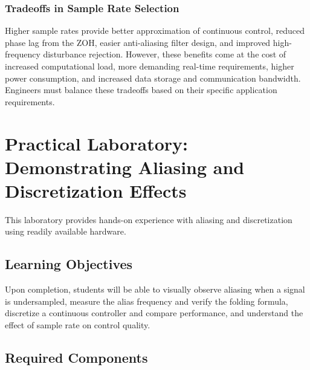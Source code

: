 \subsubsection{Tradeoffs in Sample Rate Selection}

Higher sample rates provide better approximation of continuous control, reduced phase lag from the ZOH, easier anti-aliasing filter design, and improved high-frequency disturbance rejection. However, these benefits come at the cost of increased computational load, more demanding real-time requirements, higher power consumption, and increased data storage and communication bandwidth. Engineers must balance these tradeoffs based on their specific application requirements.

\section{Practical Laboratory: Demonstrating Aliasing and Discretization Effects}
\label{sec:lab}

This laboratory provides hands-on experience with aliasing and discretization using readily available hardware.

\subsection{Learning Objectives}

Upon completion, students will be able to visually observe aliasing when a signal is undersampled, measure the alias frequency and verify the folding formula, discretize a continuous controller and compare performance, and understand the effect of sample rate on control quality.

\subsection{Required Components}

